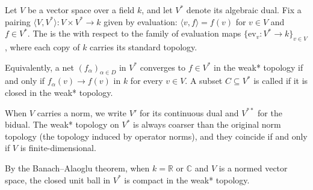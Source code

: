 \begin{definition} \label{definition:weak_star_topology_on_a_dual_space}

    Let $V$ be a vector space over a field $k$, and let $V^*$ denote its algebraic dual. Fix a pairing $\langle V, V^* \rangle : V \times V^* \to k$ given by evaluation: $\langle v, f \rangle = f(v)$ for $v \in V$ and $f \in V^*$. The  is the  with respect to the family of evaluation maps $\{\mathrm{ev}_v : V^* \to k\}_{v \in V}$, where each copy of $k$ carries its standard topology.

    Equivalently, a net $(f_\alpha)_{\alpha \in D}$ in $V^*$ converges to $f \in V^*$ in the weak* topology if and only if $f_\alpha(v) \to f(v)$ in $k$ for every $v \in V$. A subset $C \subseteq V^*$ is called  if it is closed in the weak* topology.

    When $V$ carries a norm, we write $V'$ for its continuous dual and $V^{**}$ for the bidual. The weak* topology on $V^*$ is always coarser than the original norm topology (the topology induced by operator norms), and they coincide if and only if $V$ is finite-dimensional.

    By the Banach–Alaoglu theorem, when $k = \mathbb{R}$ or $\mathbb{C}$ and $V$ is a normed vector space, the closed unit ball in $V^*$ is compact in the weak* topology.
\end{definition}
